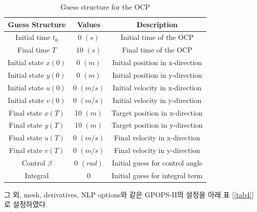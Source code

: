 \begin{table}[H]
	\begin{tabular}{|c|c|c|}
		\hline
		\textbf{Guess Structure} & \textbf{Values} & \textbf{Description}            \\
		\hline
		Initial time $t_0$       & 0 $(s)$         & Initial time of the OCP         \\
		\hline
		Final time $T$           & 10 $(s)$        & Final time of the OCP           \\
		\hline
		Initial state $x(0)$     & 0 $(m)$         & Initial position in x-direction \\
		Initial state $y(0)$     & 0 $(m)$         & Initial position in y-direction \\
		Initial state $u(0)$     & 0 $(m/s)$       & Initial velocity in x-direction \\
		Initial state $v(0)$     & 0 $(m/s)$       & Initial velocity in y-direction \\
		\hline
		Final state $x(T)$       & 10 $(m)$        & Target position in x-direction  \\
		Final state $y(T)$       & 10 $(m)$        & Target position in y-direction  \\
		Final state $u(T)$       & 0 $(m/s)$       & Final velocity in x-direction   \\
		Final state $v(T)$       & 0 $(m/s)$       & Final velocity in y-direction   \\
		\hline
		Control $\beta$          & 0 $(rad)$       & Initial guess for control angle \\
		\hline
		Integral                 & 0               & Initial guess for integral term \\
		\hline
	\end{tabular}
	\centering
	\caption{Guess structure for the OCP}
	\label{tab3}
\end{table}

그 외, mesh, derivatives, NLP options와 같은 GPOPS-II의 설정을 아래 표 [\ref{tab4}]로 설정하였다.

